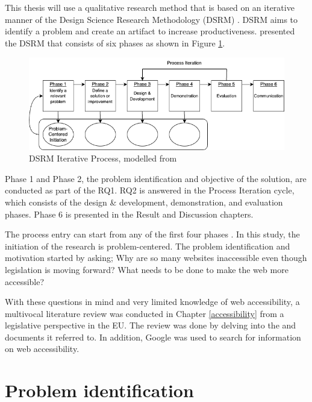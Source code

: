 This thesis will use a qualitative research method that is based on an iterative manner of the Design Science Research Methodology (DSRM) \citep{designsciencemethodology, iterativedesignscience}. DSRM aims to identify a problem and create an artifact to increase productiveness. \textcite{iterativedesignscience} presented the DSRM that consists of six phases as shown in Figure \ref{fig:design-science}.

\begin{figure}
    \centering
    \includegraphics[width=1\linewidth]{DSRM.png}
    \caption{DSRM Iterative Process, modelled from \textcite{iterativedesignscience}}
    \label{fig:design-science}
\end{figure}

Phase 1 and Phase 2, the problem identification and objective of the solution, are conducted as part of the RQ1. RQ2 is answered in the Process Iteration cycle, which consists of the design \& development, demonstration, and evaluation phases. Phase 6 is presented in the Result and Discussion chapters.

The process entry can start from any of the first four phases \citep{iterativedesignscience}. In this study, the initiation of the research is problem-centered. The problem identification and motivation started by asking; Why are so many websites inaccessible even though legislation is moving forward? What needs to be done to make the web more accessible? 

With these questions in mind and very limited knowledge of web accessibility, a multivocal literature review was conducted in Chapter \ref{accessibility} from a legislative perspective in the EU. The review was done by delving into the \textcite{eudirective2016} and documents it referred to. In addition, Google was used to search for information on web accessibility.

\section{Problem identification}

